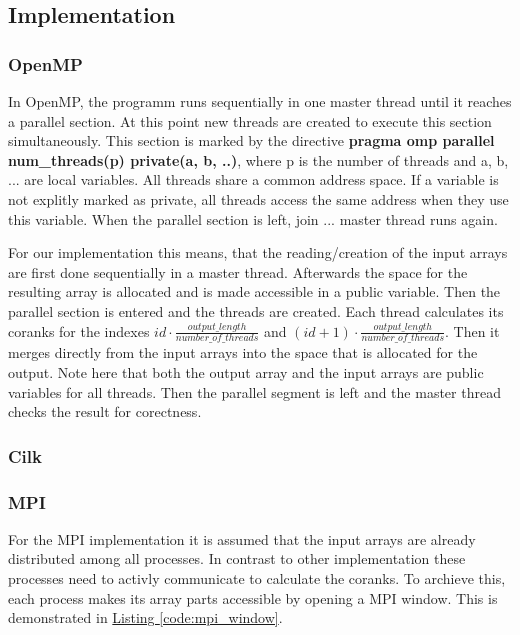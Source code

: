 \subsection{Implementation}

\subsubsection{OpenMP}
In OpenMP, the programm runs sequentially in one master thread until it reaches a parallel section.
At this point new threads are created to execute this section simultaneously.
This section is marked by the directive \textbf{pragma omp parallel num\_threads(p) private(a, b, ..)}, where p is the number of threads and a, b, ... are local variables.
All threads share a common address space.
If a variable is not explitly marked as private, all threads access the same address when they use this variable.
When the parallel section is left, join ... master thread runs again.

For our implementation this means, that the reading/creation of the input arrays are first done sequentially in a master thread.
Afterwards the space for the resulting array is allocated and is made accessible in a public variable.
Then the parallel section is entered and the threads are created.
Each thread calculates its coranks for the indexes
$id \cdot \frac{output\_length}{number\_of\_threads}$
and
$(id+1)\cdot \frac{output\_length}{number\_of\_threads}$.
Then it merges directly from the input arrays into the space that is allocated for the output.
Note here that both the output array and the input arrays are public variables for all threads.
Then the parallel segment is left and the master thread checks the result for corectness.


\subsubsection{Cilk}

\subsubsection{MPI}
For the MPI implementation it is assumed that the input arrays are already distributed among all processes.
In contrast to other implementation these processes need to activly communicate to calculate the coranks.
To archieve this, each process makes its array parts accessible by opening a MPI window.
This is demonstrated in \hyperref[code:mpi_window]{Listing \ref*{code:mpi_window}}.

